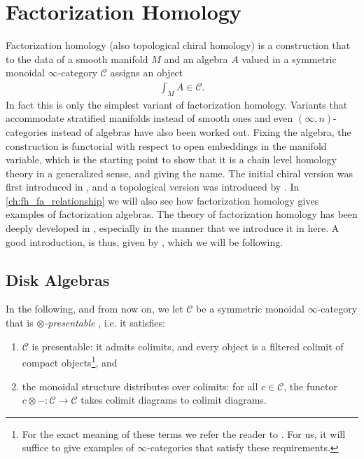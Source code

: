\documentclass[12pt,a4paper]{article}
\theoremstyle{definition}
\theoremstyle{plain}
\theoremstyle{remark}
\newcommand{\catC}{\mathscr{C}}
\begin{document}
\section{Factorization Homology}\label{ch:fact_hom}

Factorization homology (also topological chiral homology) is a construction that to the data of a smooth manifold $M$ and an algebra $A$ valued in a symmetric monoidal $\infty$-category $\catC$ assigns an object
%
\begin{align}
    \int_{M} A \in \catC.
\end{align}
%
In fact this is only the simplest variant of factorization homology. Variants that accommodate stratified manifolds instead of smooth ones and even $(\infty,n)$-categories instead of algebras have also been worked out. Fixing the algebra, the construction is functorial with respect to open embeddings in the manifold variable, which is the starting point to show that it is a chain level homology theory in a generalized sense, and giving the name. The initial chiral version was first introduced in \cite{bd2004}, and a topological version was introduced by \cite{lurie_ha}. In \cref{ch:fh_fa_relationship} we will also see how factorization homology gives examples of factorization algebras. The theory of factorization homology has been deeply developed in \cite{af_fhtop, aft_fhstrat}, especially in the manner that we introduce it in here. A good introduction, is thus, given by \cite{af_primer}, which we will be following.




\subsection{Disk Algebras}

In the following, and from now on, we let $\catC$ be a symmetric monoidal $\infty$-category that is \emph{$\otimes$-presentable} \cite{af_fhtop}, i.e. it satisfies:
%
\begin{enumerate}
    \item $\catC$ is presentable: it admits colimits, and every object is a filtered colimit of compact objects\footnote{For the exact meaning of these terms we refer the reader to \cite[sec.5.3]{lurie_htt}. For us, it will suffice to give examples of $\infty$-categories that satisfy these requirements.}, and
    \item the monoidal structure distributes over colimits: for all $c \in \catC$, the functor $c \otimes -: \catC \rightarrow \catC$ takes colimit diagrams to colimit diagrams.
\end{enumerate}
\end{document}
